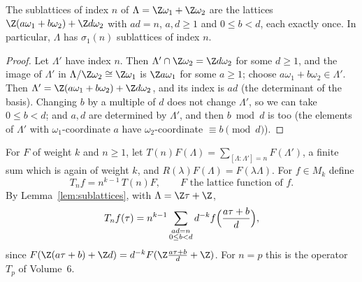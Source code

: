 \begin{lemma}\label{lem:sublattices}
The sublattices of index $n$ of $\Lambda=\Z\omega_1+\Z\omega_2$ are the lattices $\Z(a\omega_1+b\omega_2)+\Z d\omega_2$ with $ad=n$, $a,d\ge1$ and $0\le b<d$, each
exactly once. In particular, $\Lambda$ has $\sigma_1(n)$ sublattices of index $n$.
\end{lemma}
\begin{proof}
Let $\Lambda'$ have index $n$. Then $\Lambda'\cap\Z\omega_2=\Z d\omega_2$ for some $d\ge1$, and the image of $\Lambda'$ in $\Lambda/\Z\omega_2\cong\Z\omega_1$ is $\Z a\omega_1$ for some
$a\ge1$; choose $a\omega_1+b\omega_2\in\Lambda'$. Then $\Lambda'=\Z(a\omega_1+b\omega_2)+\Z d\omega_2$, and its index is $ad$ (the determinant of the basis). Changing $b$
by a multiple of $d$ does not change $\Lambda'$, so we can take $0\le b<d$; and $a,d$ are determined by $\Lambda'$, and then $b\bmod d$ is too (the elements of
$\Lambda'$ with $\omega_1$-coordinate $a$ have $\omega_2$-coordinate $\equiv b\pmod d$).
\end{proof}

For $F$ of weight $k$ and $n\ge1$, let $T(n)F(\Lambda)=\sum_{[\Lambda:\Lambda']=n}F(\Lambda')$, a finite sum which is again of weight $k$, and $R(\lambda)F(\Lambda)=F(\lambda\Lambda)$. For
$f\in M_k$ define
\[
T_nf=n^{k-1}\,T(n)F,\qquad F\text{ the lattice function of }f.
\]
By Lemma~\ref{lem:sublattices}, with $\Lambda=\Z\tau+\Z$,
\begin{equation}\label{eq:Tn}
T_nf(\tau)=n^{k-1}\sum_{\substack{ad=n\\0\le b<d}}d^{-k}f\Bigl(\frac{a\tau+b}d\Bigr),
\end{equation}
since $F(\Z(a\tau+b)+\Z d)=d^{-k}F(\Z\frac{a\tau+b}d+\Z)$. For $n=p$ this is the operator $T_p$ of Volume~6.

